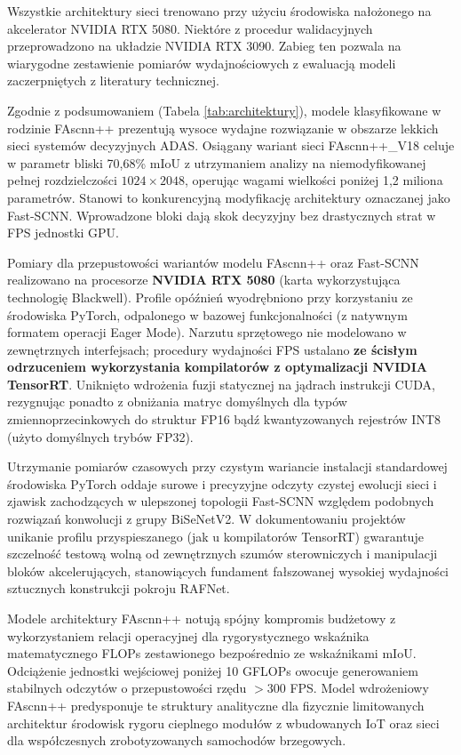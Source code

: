Wszystkie architektury sieci trenowano przy użyciu środowiska nałożonego na akcelerator NVIDIA RTX 5080. Niektóre z procedur walidacyjnych przeprowadzono na układzie NVIDIA RTX 3090. Zabieg ten pozwala na wiarygodne zestawienie pomiarów wydajnościowych z ewaluacją modeli zaczerpniętych z literatury technicznej.

Zgodnie z podsumowaniem (Tabela \ref{tab:architektury}), modele klasyfikowane w rodzinie FAscnn++ prezentują wysoce wydajne rozwiązanie w obszarze lekkich sieci systemów decyzyjnych ADAS. Osiągany wariant sieci FAscnn++\_V18 celuje w parametr bliski 70,68\% mIoU z utrzymaniem analizy na niemodyfikowanej pełnej rozdzielczości $1024 \times 2048$, operując wagami wielkości poniżej 1,2 miliona parametrów. Stanowi to konkurencyjną modyfikację architektury oznaczanej jako Fast-SCNN. Wprowadzone bloki dają skok decyzyjny bez drastycznych strat w FPS jednostki GPU.

Pomiary dla przepustowości wariantów modelu FAscnn++ oraz Fast-SCNN realizowano na procesorze \textbf{NVIDIA RTX 5080} (karta wykorzystująca technologię Blackwell). Profile opóźnień wyodrębniono przy korzystaniu ze środowiska PyTorch, odpalonego w bazowej funkcjonalności (z natywnym formatem operacji Eager Mode). Narzutu sprzętowego nie modelowano w zewnętrznych interfejsach; procedury wydajności FPS ustalano \textbf{ze ścisłym odrzuceniem wykorzystania kompilatorów z optymalizacji NVIDIA TensorRT}. Uniknięto wdrożenia fuzji statycznej na jądrach instrukcji CUDA, rezygnując ponadto z obniżania matryc domyślnych dla typów zmiennoprzecinkowych do struktur FP16 bądź kwantyzowanych rejestrów INT8 (użyto domyślnych trybów FP32).

Utrzymanie pomiarów czasowych przy czystym wariancie instalacji standardowej środowiska PyTorch oddaje surowe i precyzyjne odczyty czystej ewolucji sieci i zjawisk zachodzących w ulepszonej topologii Fast-SCNN względem podobnych rozwiązań konwolucji z grupy BiSeNetV2. W dokumentowaniu projektów unikanie profilu przyspieszanego (jak u kompilatorów TensorRT) gwarantuje szczelność testową wolną od zewnętrznych szumów sterowniczych i manipulacji bloków akcelerujących, stanowiących fundament fałszowanej wysokiej wydajności sztucznych konstrukcji pokroju RAFNet.

Modele architektury FAscnn++ notują spójny kompromis budżetowy z wykorzystaniem relacji operacyjnej dla rygorystycznego wskaźnika matematycznego FLOPs zestawionego bezpośrednio ze wskaźnikami mIoU. Odciążenie jednostki wejściowej poniżej 10 GFLOPs owocuje generowaniem stabilnych odczytów o przepustowości rzędu $>300$ FPS. Model wdrożeniowy FAscnn++ predysponuje te struktury analityczne dla fizycznie limitowanych architektur środowisk rygoru cieplnego modułów z wbudowanych IoT oraz sieci dla współczesnych zrobotyzowanych samochodów brzegowych.

